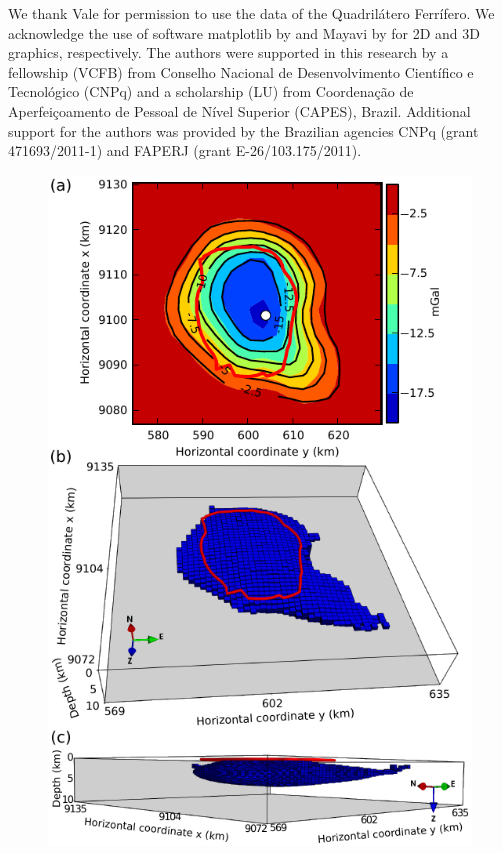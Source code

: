 \documentclass{segabs}
\begin{document}
\begin{sloppypar}
We thank Vale for permission to use the data of the Quadril\'atero Ferr\'ifero.
We acknowledge the use of software matplotlib by \citet{Hunter2007} and Mayavi
by \citet{Ramachandran2011} for 2D and 3D graphics, respectively.
The authors were supported in this research by a fellowship (VCFB) from
Conselho Nacional de Desenvolvimento Cient\'ifico e Tecnol\'ogico (CNPq) and a
scholarship (LU) from Coordena\c{c}\~ao de Aperfei\c{c}oamento de Pessoal de
N\'ivel Superior (CAPES), Brazil.
Additional support for the authors was provided by the Brazilian agencies CNPq
(grant 471693/2011-1) and FAPERJ (grant E-26/103.175/2011).
\end{sloppypar}

\begin{figure}[htb]
    \includegraphics[width=\columnwidth]{real/redencao/fig/redencao}

\end{figure}
\end{document}
